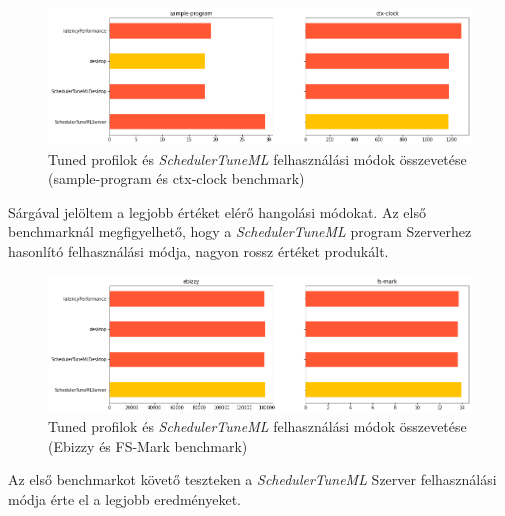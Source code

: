\begin{figure}[h!]
\centering
\includegraphics[width=\textwidth]{images/tunedAndSchedulerTuneMLCompareSampleprogramCtxclock.png}
\caption{Tuned profilok és \textit{SchedulerTuneML} felhasználási módok összevetése (sample-program és ctx-clock benchmark)}
\label{fig:tunedProfilesComparedToSchedulerTuneMlSampleprogramAndCtxClock}
\end{figure}

Sárgával jelöltem a legjobb értéket elérő hangolási módokat. Az első benchmarknál megfigyelhető, hogy a \textit{SchedulerTuneML} program Szerverhez hasonlító felhasználási módja, nagyon rossz értéket produkált.

\begin{figure}[h!]
\centering
\includegraphics[width=\textwidth]{images/tunedAndSchedulerTuneMLCompareEbizzyAndFsMark.png}
\caption{Tuned profilok és \textit{SchedulerTuneML} felhasználási módok összevetése (Ebizzy és FS-Mark benchmark)}
\label{fig:tunedProfilesComparedToSchedulerTuneMlEbizzyAndFsMark}
\end{figure}

Az első benchmarkot követő teszteken a \textit{SchedulerTuneML} Szerver felhasználási módja érte el a legjobb eredményeket.
